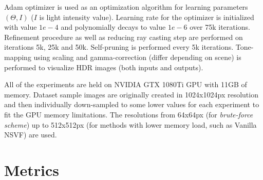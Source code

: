 Adam optimizer is used as an optimization algorithm for learning parameters $(\Theta, I)$ ($I$ is light intensity value).
Learning rate for the optimizer is initialized with value $1e-4$
and polynomially decays to value $1e-6$ over 75k iterations.
Refinement procedure as well as reducing ray casting step are performed on iterations 5k, 25k and 50k.
Self-pruning is performed every 5k iterations.
Tone-mapping using scaling and gamma-correction (differ depending on scene)
is performed to visualize HDR images (both inputs and outputs).

All of the experiments are held on NVIDIA GTX 1080Ti GPU with 11GB of memory.
Dataset sample images are originally created in 1024x1024px resolution
and then individually down-sampled to some lower values for each experiment to fit the GPU memory limitations.
The resolutions from 64x64px (for \textit{brute-force scheme}) up to 512x512px 
(for methods with lower memory load, such as Vanilla NSVF) are used.








\section{Metrics}

